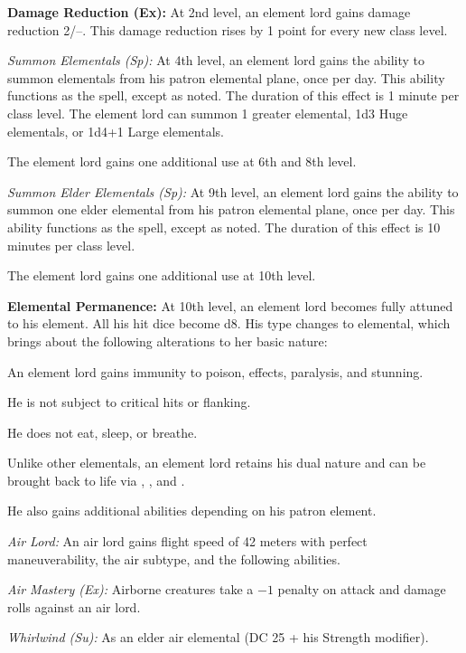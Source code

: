 {\textbf{Damage Reduction (Ex):} At 2nd level, an element lord gains damage reduction 2/--. This damage reduction rises by 1 point for every new class level.

\textit{Summon Elementals (Sp):} At 4th level, an element lord gains the ability to summon elementals from his patron elemental plane, once per day. This ability functions as the  spell, except as noted. The duration of this effect is 1 minute per class level. The element lord can summon 1 greater elemental, 1d3 Huge elementals, or 1d4+1 Large elementals.

The element lord gains one additional use at 6th and 8th level.

\textit{Summon Elder Elementals (Sp):} At 9th level, an element lord gains the ability to summon one elder elemental from his patron elemental plane, once per day. This ability functions as the  spell, except as noted. The duration of this effect is 10 minutes per class level.

The element lord gains one additional use at 10th level.

\textbf{Elemental Permanence:} At 10th level, an element lord becomes fully attuned to his element. All his hit dice become d8. His type changes to elemental, which brings about the following alterations to her basic nature:
\begin{itemize*}
\item An element lord gains immunity to poison,  effects, paralysis, and stunning.
\item He is not subject to critical hits or flanking.
\item He does not eat, sleep, or breathe.
\item Unlike other elementals, an element lord retains his dual nature and can be brought back to life via , , and .
\end{itemize*}

He also gains additional abilities depending on his patron element.

\textit{Air Lord:} An air lord gains flight speed of 42 meters with perfect maneuverability, the air subtype, and the following abilities.

\emph{Air Mastery (Ex):} Airborne creatures take a $-1$ penalty on attack and damage rolls against an air lord.

\emph{Whirlwind (Su):} As an elder air elemental (DC 25 + his Strength modifier).


}
